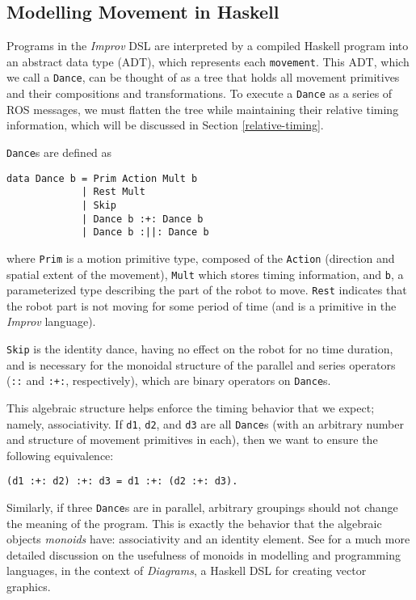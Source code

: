 \documentclass[sigconf]{acmart}
\begin{document}
\subsection{Modelling Movement in
Haskell}\label{modelling-movement-in-haskell}

Programs in the \emph{Improv} DSL are interpreted by a compiled Haskell
program into an abstract data type (ADT), which represents each
\texttt{movement}. This ADT, which we call a \texttt{Dance}, can be thought of as
a tree that holds all movement primitives and their compositions and
transformations. To
execute a \texttt{Dance} as a series of ROS messages, we must flatten
the tree while maintaining their relative timing information, which will
be discussed in Section \ref{relative-timing}.

\texttt{Dance}s are defined as

\begin{verbatim}
data Dance b = Prim Action Mult b
             | Rest Mult
             | Skip
             | Dance b :+: Dance b
             | Dance b :||: Dance b
\end{verbatim}

where \texttt{Prim} is a motion primitive type, composed of the
\texttt{Action} (direction and spatial extent of the movement),
\texttt{Mult} which stores timing information, and \texttt{b}, a parameterized type describing the
part of the robot to move. \texttt{Rest} indicates that the robot part
is not moving for some period of time (and is a primitive in the
\emph{Improv} language). 

\texttt{Skip} is the identity dance, having no
effect on the robot for no time duration, and is necessary for the
monoidal structure of the parallel and
series operators (\texttt{:\textbar{}\textbar{}:} and \texttt{:+:},
respectively), which are binary operators on \texttt{Dance}s.

This algebraic structure helps enforce the timing behavior that we
expect; namely, associativity. If \texttt{d1}, \texttt{d2}, and
\texttt{d3} are all \texttt{Dance}s (with an arbitrary number and
structure of movement primitives in each), then we want to ensure the
following equivalence:

\begin{verbatim}
(d1 :+: d2) :+: d3 = d1 :+: (d2 :+: d3).
\end{verbatim}

Similarly, if three \texttt{Dance}s are in parallel, arbitrary groupings
should not change the meaning of the program. This is exactly the
behavior that the algebraic objects \emph{monoids} have: 
associativity and an identity element. See \cite{yorgey2012monoids} for a much more
detailed discussion on the usefulness of monoids in modelling and
programming languages, in the context of \emph{Diagrams}, a Haskell DSL
for creating vector graphics.
\end{document}
